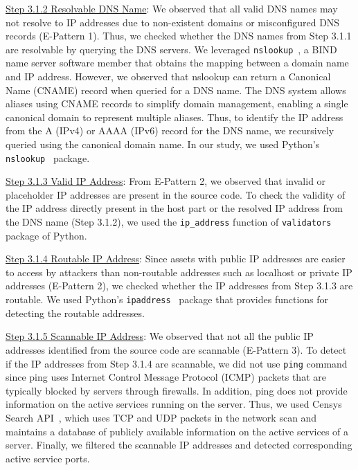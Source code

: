 \uline{Step 3.1.2 Resolvable DNS Name}: We observed that all valid DNS names may not resolve to IP addresses due to non-existent domains or misconfigured DNS records (E-Pattern 1). Thus, we checked whether the DNS names from Step 3.1.1 are resolvable by querying the DNS servers. We leveraged \texttt{nslookup}~\cite{nslookup}, a BIND name server software member that obtains the mapping between a domain name and IP address. However, we observed that nslookup can return a Canonical Name (CNAME) record when queried for a DNS name. The DNS system allows aliases using CNAME records to simplify domain management, enabling a single canonical domain to represent multiple aliases. Thus, to identify the IP address from the A (IPv4) or AAAA (IPv6) record for the DNS name, we recursively queried using the canonical domain name. In our study, we used Python's \texttt{nslookup}~\cite{python-nslookup} package.

\uline{Step 3.1.3 Valid IP Address}: From E-Pattern 2, we observed that invalid or placeholder IP addresses are present in the source code. To check the validity of the IP address directly present in the host part or the resolved IP address from the DNS name (Step 3.1.2), we used the \texttt{ip\_address} function of \texttt{validators}~\cite{validators} package of Python.

\uline{Step 3.1.4 Routable IP Address}: Since assets with public IP addresses are easier to access by attackers than non-routable addresses such as localhost or private IP addresses (E-Pattern 2), we checked whether the IP addresses from Step 3.1.3 are routable. We used Python's \texttt{ipaddress}~\cite{ipaddress} package that provides functions for detecting the routable addresses.

\uline{Step 3.1.5 Scannable IP Address}: We observed that not all the public IP addresses identified from the source code are scannable (E-Pattern 3). To detect if the IP addresses from Step 3.1.4 are scannable, we did not use \texttt{ping} command since ping uses Internet Control Message Protocol (ICMP) packets that are typically blocked by servers through firewalls. In addition, ping does not provide information on the active services running on the server. Thus, we used Censys Search API~\cite{durumeric2015search}, which uses TCP and UDP packets in the network scan and maintains a database of publicly available information on the active services of a server. Finally, we filtered the scannable IP addresses and detected corresponding active service ports.

